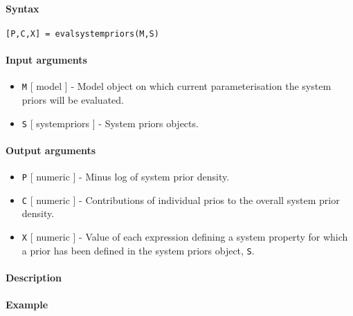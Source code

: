 


	\paragraph{Syntax}

\begin{verbatim}
[P,C,X] = evalsystempriors(M,S)
\end{verbatim}

\paragraph{Input arguments}

\begin{itemize}
\item
  \texttt{M} {[} model {]} - Model object on which current
  parameterisation the system priors will be evaluated.
\item
  \texttt{S} {[} systempriors {]} - System priors objects.
\end{itemize}

\paragraph{Output arguments}

\begin{itemize}
\item
  \texttt{P} {[} numeric {]} - Minus log of system prior density.
\item
  \texttt{C} {[} numeric {]} - Contributions of individual prios to the
  overall system prior density.
\item
  \texttt{X} {[} numeric {]} - Value of each expression defining a
  system property for which a prior has been defined in the system
  priors object, \texttt{S}.
\end{itemize}

\paragraph{Description}

\paragraph{Example}


